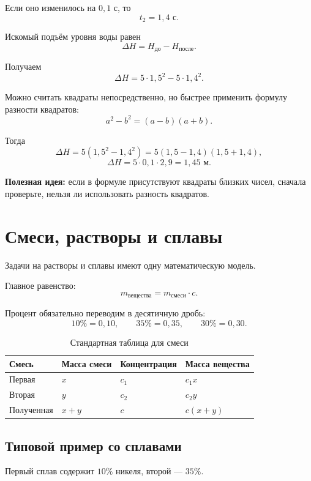 \documentclass[a4paper,12pt]{article}
\newcommand{\key}[1]{\textcolor{darkaccent}{\textbf{#1}}}
\begin{document}
Если оно изменилось на \(0{,}1\) с, то
\[
t_2=1{,}4\text{ с}.
\]

Искомый подъём уровня воды равен
\[
\Delta H
=
H_{\text{до}}-H_{\text{после}}.
\]

Получаем
\[
\Delta H
=
5\cdot1{,}5^2-5\cdot1{,}4^2.
\]

Можно считать квадраты непосредственно, но быстрее применить
формулу разности квадратов:
\[
a^2-b^2=(a-b)(a+b).
\]

Тогда
\[
\Delta H
=
5(1{,}5^2-1{,}4^2)
=
5(1{,}5-1{,}4)(1{,}5+1{,}4),
\]
\[
\Delta H
=
5\cdot0{,}1\cdot2{,}9
=
1{,}45\text{ м}.
\]

\key{Полезная идея:}
если в формуле присутствуют квадраты близких чисел, сначала проверьте,
нельзя ли использовать разность квадратов.


\section{Смеси, растворы и сплавы}

Задачи на растворы и сплавы имеют одну математическую модель.

Главное равенство:
\[
m_{\text{вещества}}
=
m_{\text{смеси}}\cdot c.
\]

Процент обязательно переводим в десятичную дробь:
\[
10\%=0{,}10,
\qquad
35\%=0{,}35,
\qquad
30\%=0{,}30.
\]

\begin{table}[ht]
\centering
\caption{Стандартная таблица для смеси}
\renewcommand{\arraystretch}{1.4}
\begin{tabularx}{\linewidth}{Y Y Y Y}
\toprule
Смесь &
Масса смеси &
Концентрация &
Масса вещества \\
\midrule
Первая &
\(x\) &
\(c_1\) &
\(c_1x\) \\
Вторая &
\(y\) &
\(c_2\) &
\(c_2y\) \\
Полученная &
\(x+y\) &
\(c\) &
\(c(x+y)\) \\
\bottomrule
\end{tabularx}
\end{table}

\subsection*{Типовой пример со сплавами}

Первый сплав содержит \(10\%\) никеля,
второй --- \(35\%\).
\end{document}
